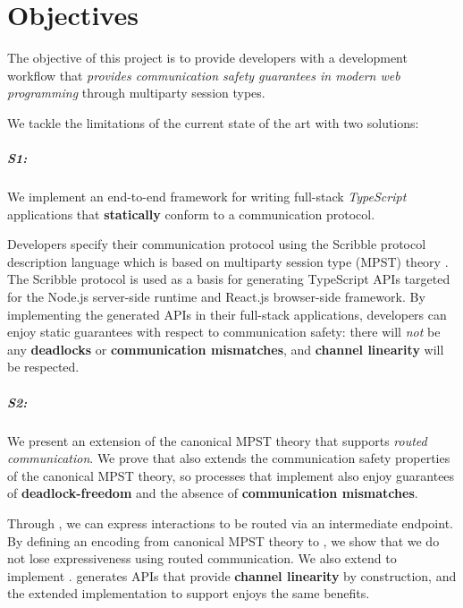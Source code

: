 \section{Objectives}

The objective of this project is to provide
developers with a development workflow
that \textit{provides communication safety guarantees in modern
web programming} through multiparty session types.

We tackle the limitations of the current
state of the art with two solutions:

\subparagraph{S1: \codegen}
We implement an end-to-end framework
for writing full-stack \textit{TypeScript} applications that
\textbf{statically} conform to a communication protocol.

Developers specify their communication protocol using
the Scribble protocol description language \cite{Scribble}
which is based on multiparty session type (MPST) theory \cite{MPST}.
The Scribble protocol is used as a basis for generating
TypeScript APIs targeted for the Node.js server-side runtime
and React.js browser-side framework.
By implementing the generated APIs in their full-stack applications,
developers can enjoy static guarantees with respect 
to communication safety: 
there will \textit{not} be any \textbf{deadlocks} or
\textbf{communication mismatches},
and \textbf{channel linearity} will be respected.

\subparagraph{S2: \newtheory}
We present an extension of the canonical MPST
theory that supports \textit{routed communication}.
We prove that \newtheory also extends the communication safety
properties of the canonical MPST theory, so
processes that implement \newtheory also enjoy
guarantees of \textbf{deadlock-freedom}
and the absence
of \textbf{communication mismatches}.

Through \newtheory, we can express interactions to be
routed via an intermediate endpoint.
By defining an encoding from canonical MPST theory
to \newtheory, we show that we do not lose expressiveness
using routed communication.
We also extend \codegen to implement \newtheory.
\codegen generates APIs that provide \textbf{channel linearity}
by construction, and the extended
implementation to support \newtheory enjoys the same benefits.
\\

